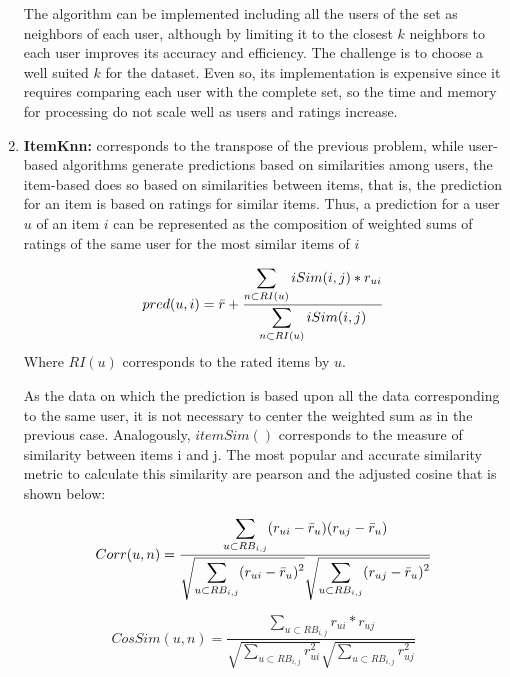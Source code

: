 \documentclass[letterpaper, 10 pt, conference]{ieeeconf}  %
\begin{document}
\begin{enumerate}
    The algorithm can be implemented including all the users of the set as neighbors of each user, although by limiting it to the closest $k$ neighbors to each user improves its accuracy and efficiency. The challenge is to choose a well suited $k$ for the dataset. Even so, its implementation is expensive since it requires comparing each user with the complete set, so the time and memory for processing do not scale well as users and ratings increase. 
    
    
    \item \textbf{ItemKnn: } corresponds to the transpose of the previous problem, while user-based algorithms generate predictions based on similarities among users, the item-based does so based on similarities between items, that is, the prediction for an item is based on ratings for similar items. Thus, a prediction for a user $u$ of an item $i$ can be represented as the composition of weighted sums of ratings of the same user for the most similar items of $i$ 
    
    \begin{equation}
        pred(u,i)=\Bar{r}+ \frac{\displaystyle \sum_{n \subset RI(u)}iSim(i,j)*r_{ui}}{\displaystyle \sum_{n \subset RI(u)}iSim(i,j)}
    \end{equation}
    Where $RI(u)$ corresponds to the rated items by $u$.
    
    As the data on which the prediction is based upon all the data corresponding to the same user, it is not necessary to center the weighted sum as in the previous case. Analogously, $itemSim()$ corresponds to the measure of similarity between items i and j. The most popular and accurate similarity metric to calculate this similarity are pearson and the adjusted cosine that is shown below:
    
     \begin{equation}
        Corr(u,n)=\frac{\displaystyle \sum_{u \subset RB_{i,j}}(r_{ui}-\Bar{r}_{u})(r_{uj}-\Bar{r}_{u})}{ \sqrt{\displaystyle \sum_{u \subset RB_{i,j}}(r_{ui}-\Bar{r}_{u})^2}  \sqrt{\displaystyle \sum_{u \subset RB_{i,j}}(r_{uj}-\Bar{r}_{u})^2} }
    \end{equation}
    
    \begin{equation}
        CosSim(u,n)= 
        \frac{ \displaystyle\sum_{u \subset RB_{i,j}} r_{ui}*r_{uj} }
        {\displaystyle \sqrt{\sum_{u \subset RB_{i,j}}r_{ui}^2}
                        \sqrt{\sum_{u \subset RB_{i,j}}r_{uj}^2}}
    \end{equation}
    

\end{enumerate}
\end{document}
